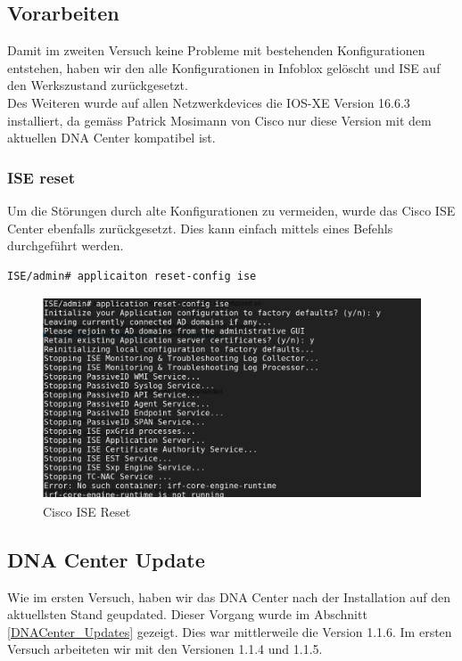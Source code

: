 \subsection{Vorarbeiten}

Damit im zweiten Versuch keine Probleme mit bestehenden Konfigurationen entstehen, haben wir den alle Konfigurationen in Infoblox gelöscht und ISE auf den Werkszustand zurückgesetzt. \\
Des Weiteren wurde auf allen Netzwerkdevices die IOS-XE Version 16.6.3 installiert, da gemäss Patrick Mosimann von Cisco nur diese Version mit dem aktuellen DNA Center kompatibel ist.

\subsubsection{ISE reset}
Um die Störungen durch alte Konfigurationen zu vermeiden, wurde das Cisco ISE Center ebenfalls zurückgesetzt. Dies kann einfach mittels eines Befehls durchgeführt werden.

\begin{lstlisting}[language=bash]
ISE/admin# applicaiton reset-config ise
\end{lstlisting}

\begin{figure}[H]
	\centering
	\includegraphics[height=6cm]{img/secondtry/s2t-cisco-ise-reset.png}
	\caption{Cisco ISE Reset}
	\label{fig:dna-ise-reset-1}
\end{figure}


\subsection{DNA Center Update}

Wie im ersten Versuch, haben wir das DNA Center nach der Installation auf den aktuellsten Stand geupdated. Dieser Vorgang wurde im Abschnitt \ref{DNACenter_Updates} gezeigt. Dies war mittlerweile die Version 1.1.6. Im ersten Versuch arbeiteten wir mit den Versionen 1.1.4 und 1.1.5.

